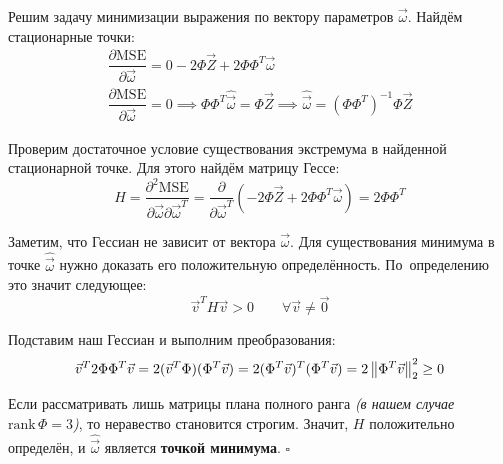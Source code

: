 Решим задачу минимизации выражения по вектору параметров \( \vec{\omega} \). Найдём стационарные точки:
\begin{equation}
    \begin{gathered}
    \dfrac{\partial\textrm{MSE}}{\partial\vec{\omega}}=0-2\Phi\vec{Z}+2\Phi\Phi^T\vec{\omega}\\
    \dfrac{\partial\textrm{MSE}}{\partial\vec{\omega}}=0\implies \Phi\Phi^T\hat{\vec{\omega}}=\Phi\vec{Z}\implies\hat{\vec{\omega}}=(\Phi\Phi^T)^{-1}\Phi\vec{Z}\label{eq:approximation}
    \end{gathered}
\end{equation}

Проверим достаточное условие существования экстремума в найденной стационарной точке. Для этого найдём матрицу Гессе:
\[
    H=\dfrac{\partial^2\textrm{MSE}}{\partial\vec{\omega}\partial\vec{\omega}^T}=\dfrac{\partial}{\partial\vec{\omega}^T}(-2\Phi\vec{Z}+2\Phi\Phi^T\vec{\omega})=2\Phi\Phi^T
\]

Заметим, что Гессиан не зависит от вектора \( \vec{\omega} \). Для существования минимума в точке \( \hat{\vec{\omega}} \) нужно доказать его положительную определённость. По~определению это значит следующее:
\[
    \vec{v}^TH\vec{v}>0\qquad\forall\vec{v}\neq\vec{0}
\]

Подставим наш Гессиан и выполним преобразования:
\[
    \vec{v}^T2\Phi\Phi^T\vec{v}=2(\vec{v}^T\Phi)(\Phi^T\vec{v})=2(\Phi^T\vec{v})^T(\Phi^T\vec{v})=2\left\lVert\Phi^T\vec{v}\right\rVert_2^2\geq 0
\]

Если рассматривать лишь матрицы плана полного ранга \textit{(в нашем случае} \( \textrm{rank}\,\Phi=3 \)\textit{)}, то неравество становится строгим. Значит, \( H \) положительно определён, и \( \hat{\vec{\omega}} \) является \textbf{точкой минимума}. \( \square \)